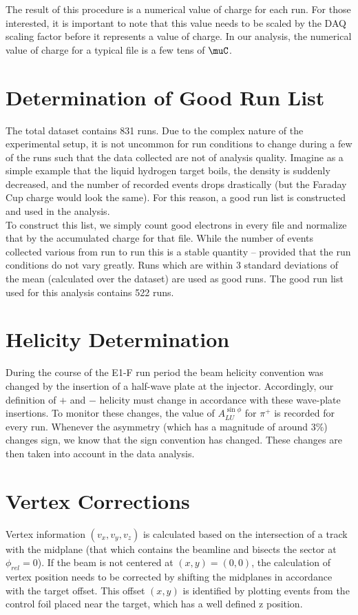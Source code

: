 The result of this procedure is a numerical value of charge for each run.  For those interested, it is important to note that this value needs to be scaled by the DAQ scaling factor before it represents a value of charge.  In our analysis, the numerical value of charge for a typical file is a few tens of $\muC$.

\section{Determination of Good Run List}
The total dataset contains 831 runs.  Due to the complex nature of the experimental setup, it is not uncommon for run conditions to change during a few of the runs such that the data collected are not of analysis quality.  Imagine as a simple example that the liquid hydrogen target boils, the density is suddenly decreased, and the number of recorded events drops drastically (but the Faraday Cup charge would look the same).  For this reason, a good run list is constructed and used in the analysis. \\

To construct this list, we simply count good electrons in every file and normalize that by the accumulated charge for that file.  While the number of events collected various from run to run this is a stable quantity -- provided that the run conditions do not vary greatly.  Runs which are within 3 standard deviations of the mean (calculated over the dataset) are used as good runs.  The good run list used for this analysis contains 522 runs.  

\section{Helicity Determination}
During the course of the E1-F run period the beam helicity convention was changed by the insertion of a half-wave plate at the injector.  Accordingly, our definition of $+$ and $-$ helicity must change in accordance with these wave-plate insertions.  To monitor these changes, the value of $A_{LU}^{\sin\phi}$ for $\pi^+$ is recorded for every run.  Whenever the asymmetry (which has a magnitude of around $3\%$) changes sign, we know that the sign convention has changed.  These changes are then taken into account in the data analysis.   

\section{Vertex Corrections}
Vertex information $(v_x, v_y, v_z)$ is calculated based on the intersection of a track with the midplane (that which contains the beamline and bisects the sector at $\phi_{rel} = 0$).  If the beam is not centered at $(x,y)=(0,0)$, the calculation of vertex position needs to be corrected by shifting the midplanes in accordance with the target offset.  This offset $(x,y)$ is identified by plotting events from the control foil placed near the target, which has a well defined z position. \\
      
